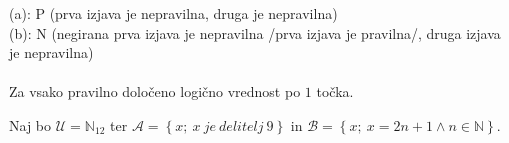 \documentclass[addpoints]{exam}
\begin{document}
\begin{questions}
    \begin{solution}
        (a): P (prva izjava je nepravilna, druga je nepravilna) \\
        (b): N (negirana prva izjava je nepravilna /prva izjava je pravilna/, druga izjava je nepravilna) \\ \\
        Za vsako pravilno določeno logično vrednost po $1$ točka.
    \end{solution}



    \newpage

    \question
    Naj bo $\mathcal{U}=\mathbb{N}_{12}$ ter $\mathcal{A}=\left\{x;\ x~ je~ delitelj~ 9\right\}$ in $\mathcal{B}=\left\{x;\ x=2n+1\land n\in\mathbb{N}\right\}$.



\end{questions}
\end{document}
